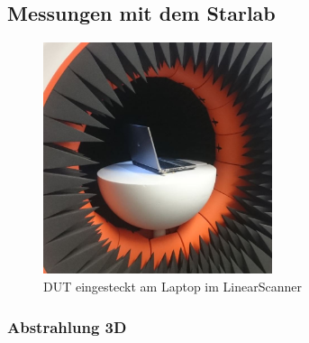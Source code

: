 \newpage
\subsection{Messungen mit dem Starlab}

\begin{figure}[h!]
	\centering
	\includegraphics[width=0.6\textwidth]{../fig/plt/LaptopimStarLab.JPG}
	\caption{DUT eingesteckt am Laptop im LinearScanner}
	\label{fig:LaptopimStarlab}
\end{figure}

\clearpage
\subsubsection{Abstrahlung 3D}

